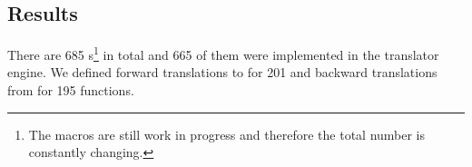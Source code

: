 


\subsection{Results}\label{sec:test-summary}
There are 685 \Macro s\footnote{The macros are still work in progress and therefore the total number is constantly changing.} in total and 665 of them were implemented in the translator engine. We defined forward translations to \Maple{} for 201 and backward translations from \Maple{} for 195 functions. 

